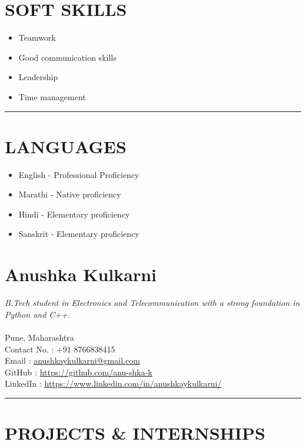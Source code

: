 \documentclass[a4paper,10pt]{article}
\begin{document}
\begin{paracol}{2}
\begin{leftcolumn*}
	\section*{SOFT SKILLS}
	\begin{itemize}
		\item Teamwork
		\item Good communication skills
		\item Leadership
		\item Time management
	\end{itemize}
	\vspace{0.1em}
	\hrule
	\section*{LANGUAGES}
	\begin{itemize}
		\item English - Professional Proficiency
		\item Marathi - Native proficiency
		\item Hindi - Elementary proficiency
		\item Sanskrit - Elementary proficiency
	\end{itemize}

\end{leftcolumn*}

\switchcolumn

	\section*{\Huge Anushka Kulkarni}
		\textit{B.Tech student in Electronics and Telecommunication with a strong foundation in Python and C++.} \\ \\
		Pune, Maharashtra  \\
		Contact No. : +91 8766838415  \\
		Email : \href {anushkaykulkarni@gmail.com}{anushkaykulkarni@gmail.com} \\
		GitHub : \href {https://github.com/anu-shka-k}{https://github.com/anu-shka-k}  \\
		LinkedIn : \href {https://www.linkedin.com/in/anushkaykulkarni/}{https://www.linkedin.com/in/anushkaykulkarni/}  \\
		
		\hrule
		
	\section*{PROJECTS \& INTERNSHIPS}
		\begin{itemize}
	

\end{itemize}
\end{paracol}
\end{document}

